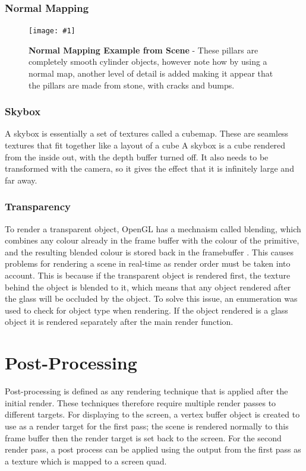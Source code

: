 \documentclass[conference]{acmsiggraph}
\newcommand{\figuremacroW}[4]{
	\begin{figure}[h] %
		\centering
		\texttt{[image: \#1]}
		\caption[#2]{\textbf{#2} - #3}
		\label{fig:#1}
	\end{figure}
}
\begin{document}
\subsubsection{Normal Mapping}
\figuremacroW
{normalMap}
{Normal Mapping Example from Scene}
{These pillars are completely smooth cylinder objects, however note how by using a normal map, another level of detail is added making it appear that the pillars are made from stone, with cracks and bumps.}
{1.0}

\subsubsection{Skybox}
A skybox is essentially a set of textures called a cubemap. These are seamless textures that fit together like a layout of a cube
A skybox is a cube rendered from the inside out, with the depth buffer turned off. It also needs to be transformed with the camera, so it gives the effect that it is infinitely large and far away.

\subsubsection{Transparency}

To render a transparent object, OpenGL has a mechnaism called blending, which combines any colour already in the frame buffer with the colour of the primitive, and the resulting blended colour is stored back in the framebuffer \cite{openGLBlend}. This causes problems for rendering a scene in real-time as render order must be taken into account. This is because if the transparent object is rendered first, the texture behind the object is blended to it, which means that any object rendered after the glass will be occluded by the object.
To solve this issue, an enumeration was used to check for object type when rendering. If the object rendered is a glass object it is rendered separately after the main render function.

\section{Post-Processing}

Post-processing is defined as any rendering technique that is applied after the initial render. These techniques therefore require multiple render passes to different targets. For displaying to the screen, a vertex buffer object is created to use as a render target for the first pass; the scene is rendered normally to this frame buffer then the render target is set back to the screen. For the second render pass, a post process can be applied using the output from the first pass as a texture which is mapped to a screen quad.
\end{document}
